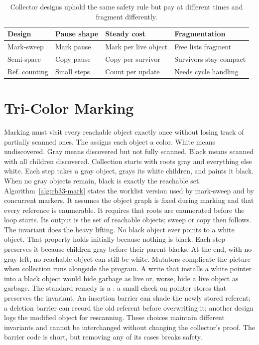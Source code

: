 \begin{table}[htbp]
\centering
\caption{Collector designs uphold the same safety rule but pay at different times and fragment differently.}
\label{tab:ch33-collectors}
\begin{tabular}{llll}
\toprule
Design & Pause shape & Steady cost & Fragmentation \\
\midrule
Mark-sweep & Mark pause & Mark per live object & Free lists fragment \\
Semi-space & Copy pause & Copy per survivor & Survivors stay compact \\
Ref. counting & Small steps & Count per update & Needs cycle handling \\
\bottomrule
\end{tabular}
\end{table}

\section{Tri-Color Marking}\label{sec:ch33-tricolor}

Marking must visit every reachable object exactly once without losing track of partially scanned ones.
The  assigns each object a color.
White means undiscovered.
Gray means discovered but not fully scanned.
Black means scanned with all children discovered.
Collection starts with roots gray and everything else white.
Each step takes a gray object, grays its white children, and paints it black.
When no gray objects remain, black is exactly the reachable set.
Algorithm~\ref{alg:ch33-mark} states the worklist version used by mark-sweep and by concurrent markers.
It assumes the object graph is fixed during marking and that every reference is enumerable.
It requires that roots are enumerated before the loop starts.
Its output is the set of reachable objects; sweep or copy then follows.
The invariant does the heavy lifting.
No black object ever points to a white object.
That property holds initially because nothing is black.
Each step preserves it because children gray before their parent blacks.
At the end, with no gray left, no reachable object can still be white.
Mutators complicate the picture when collection runs alongside the program.
A write that installs a white pointer into a black object would hide garbage as live or, worse, hide a live object as garbage.
The standard remedy is a : a small check on pointer stores that preserves the invariant.
An insertion barrier can shade the newly stored referent; a deletion barrier can record the old referent before overwriting it; another design logs the modified object for rescanning.
These choices maintain different invariants and cannot be interchanged without changing the collector's proof.
The barrier code is short, but removing any of its cases breaks safety.

